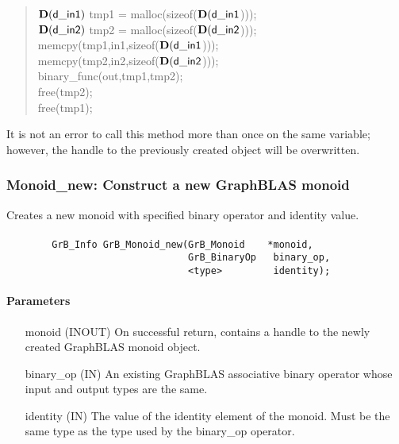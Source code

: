 \begin{quote}
\begin{code}
    $\mathbf{D}({\sf d\_in1})$ tmp1 = malloc(sizeof($\mathbf{D}({\sf d\_in1}$))); \\
    $\mathbf{D}({\sf d\_in2})$ tmp2 = malloc(sizeof($\mathbf{D}({\sf d\_in2}$))); \\
    memcpy(tmp1,in1,sizeof($\mathbf{D}({\sf d\_in1}$))); \\
    memcpy(tmp2,in2,sizeof($\mathbf{D}({\sf d\_in2}$))); \\
    binary\_func(out,tmp1,tmp2); \\
    free(tmp2); \\
    free(tmp1);
\end{code}
\end{quote}

It is not an error to call this method more than once on the same variable;  
however, the handle to the previously created object will be overwritten. 


\subsubsection{{\sf Monoid\_new}: Construct a new GraphBLAS monoid}

Creates a new monoid with specified binary operator and identity value.

\paragraph{\syntax}

\begin{verbatim}
        GrB_Info GrB_Monoid_new(GrB_Monoid    *monoid,
                                GrB_BinaryOp   binary_op,
                                <type>         identity);
\end{verbatim}

\paragraph{Parameters}

\begin{itemize}[leftmargin=1.1in]
    \item[{\sf monoid}] ({\sf INOUT}) On successful return, contains a
                         handle to the newly created GraphBLAS monoid object.
    \item[{\sf binary\_op}] ({\sf IN}) An existing GraphBLAS associative binary 
                         operator whose input and output types are the same.
    \item[{\sf identity}]  ({\sf IN}) The value of the identity element of the 
                         monoid. Must be the same type as the type used by the
                         {\sf binary\_op} operator.
\end{itemize}


